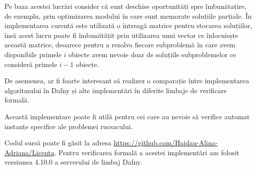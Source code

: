 \begin{sloppypar}
Pe baza acestei lucrări consider că sunt deschise oportunități spre  îmbunătațire, de exemplu, prin optimizarea modului în care sunt memorate soluțiile parțiale. În implementarea curentă este utilizată o întreagă matrice pentru stocarea soluțiilor, însă acest lucru poate fi îmbunătățit prin utilizarea unui vector ce înlocuiește această matrice, deoarece pentru a rezolva fiecare subproblemă în care avem disponibile primele $i$ obiecte avem nevoie doar de soluțiile subproblemelor ce consideră primele $i - 1$ obiecte. \par
De asemenea, ar fi foarte interesant să realizez o comparație între implementarea algoritmului în Dafny și alte implementări în diferite limbaje de verificare formală. \par
Această implementare poate fi utilă pentru cei care au nevoie să verifice automat instanțe specifice ale problemei rucsacului. \par
Codul sursă poate fi găsit la adresa \url{https://github.com/Haidau-Alina-Adriana/Licenta}. Pentru verificarea formală a acestei implementări am folosit versiunea 4.10.0 a serverului de limbaj Dafny. \par
\end{sloppypar}
